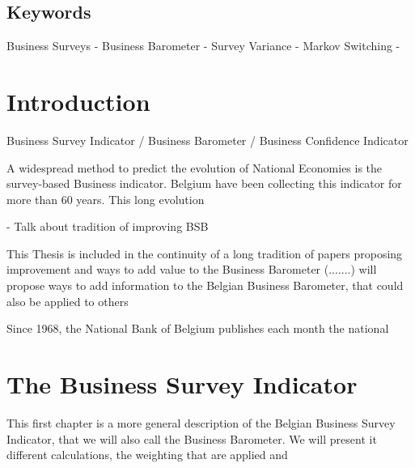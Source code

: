 \documentclass[12pt,a4paper,oneside]{book}
\begin{document}
\section*{Keywords}
Business Surveys - 
Business Barometer -
Survey Variance - 
Markov Switching - 

\tableofcontents

\newpage
\setcounter{page}{0}


\chapter{Introduction}

\cite{lemasson_enquete_2017}

Business Survey Indicator / Business Barometer / Business Confidence Indicator

A widespread method to predict the evolution of National Economies is the survey-based Business indicator. Belgium have been collecting this indicator for more than 60 years. This long evolution 

- Talk about tradition of improving BSB

This Thesis is included in the continuity of a long tradition of papers proposing improvement and ways to add value to the Business Barometer (.......) will propose ways to add information to the Belgian Business Barometer, that could also be applied to others

Since 1968, the National Bank of Belgium publishes each month the national 







\chapter{The Business Survey Indicator}

This first chapter is a more general description of the Belgian Business Survey Indicator, that we will also call the Business Barometer.
We will present it different calculations, the weighting that are applied and 
\end{document}
